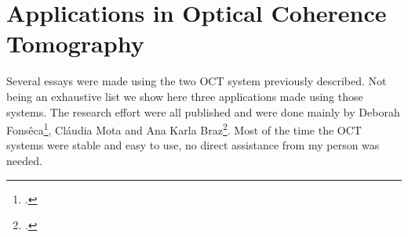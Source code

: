 \documentclass[12pt,twoside,english]{book}
\renewcommand{\~}{\perispomeni}%
\numberwithin{equation}{section}
\numberwithin{figure}{section}
\begin{document}
\chapter{Applications in Optical Coherence Tomography}

Several essays were made using the two OCT system previously described. Not being an exhaustive list we show here three applications made using those systems. The research effort were all published and were done mainly by Deborah Fonsêca\footcite{Fonseca:2009p1}, Cláudia Mota and Ana Karla Braz\footcite{Braz:2009p2143}. Most of the time the OCT systems were stable and easy to use, no direct assistance from my person was needed.


\end{document}
